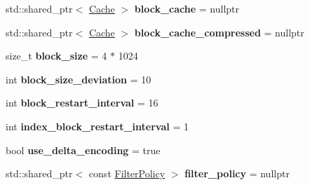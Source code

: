 \begin{DoxyCompactItemize}
\item 
std\+::shared\+\_\+ptr$<$ \hyperlink{classrocksdb_1_1Cache}{Cache} $>$ {\bfseries block\+\_\+cache} = nullptr\hypertarget{structrocksdb_1_1BlockBasedTableOptions_af7012b6cfc023265669ca3db6fd8a6ac}{}\label{structrocksdb_1_1BlockBasedTableOptions_af7012b6cfc023265669ca3db6fd8a6ac}

\item 
std\+::shared\+\_\+ptr$<$ \hyperlink{classrocksdb_1_1Cache}{Cache} $>$ {\bfseries block\+\_\+cache\+\_\+compressed} = nullptr\hypertarget{structrocksdb_1_1BlockBasedTableOptions_a333d1974b959b500e643e73d42f079f2}{}\label{structrocksdb_1_1BlockBasedTableOptions_a333d1974b959b500e643e73d42f079f2}

\item 
size\+\_\+t {\bfseries block\+\_\+size} = 4 $\ast$ 1024\hypertarget{structrocksdb_1_1BlockBasedTableOptions_ac6d52bc1b24b8420aa8565be69d8c503}{}\label{structrocksdb_1_1BlockBasedTableOptions_ac6d52bc1b24b8420aa8565be69d8c503}

\item 
int {\bfseries block\+\_\+size\+\_\+deviation} = 10\hypertarget{structrocksdb_1_1BlockBasedTableOptions_ad32cd3d71e1f30b9962a7c8de3cc16e5}{}\label{structrocksdb_1_1BlockBasedTableOptions_ad32cd3d71e1f30b9962a7c8de3cc16e5}

\item 
int {\bfseries block\+\_\+restart\+\_\+interval} = 16\hypertarget{structrocksdb_1_1BlockBasedTableOptions_a8bd604aaca756ab9e6308c8b198283ef}{}\label{structrocksdb_1_1BlockBasedTableOptions_a8bd604aaca756ab9e6308c8b198283ef}

\item 
int {\bfseries index\+\_\+block\+\_\+restart\+\_\+interval} = 1\hypertarget{structrocksdb_1_1BlockBasedTableOptions_a23a65c7cba2b2b44386cceb5b2077604}{}\label{structrocksdb_1_1BlockBasedTableOptions_a23a65c7cba2b2b44386cceb5b2077604}

\item 
bool {\bfseries use\+\_\+delta\+\_\+encoding} = true\hypertarget{structrocksdb_1_1BlockBasedTableOptions_a115eda587a9b226a49c662310fc66fae}{}\label{structrocksdb_1_1BlockBasedTableOptions_a115eda587a9b226a49c662310fc66fae}

\item 
std\+::shared\+\_\+ptr$<$ const \hyperlink{classrocksdb_1_1FilterPolicy}{Filter\+Policy} $>$ {\bfseries filter\+\_\+policy} = nullptr\hypertarget{structrocksdb_1_1BlockBasedTableOptions_accd96f660a1807c81d9f29fa56bfaa7c}{}\label{structrocksdb_1_1BlockBasedTableOptions_accd96f660a1807c81d9f29fa56bfaa7c}


\end{DoxyCompactItemize}
